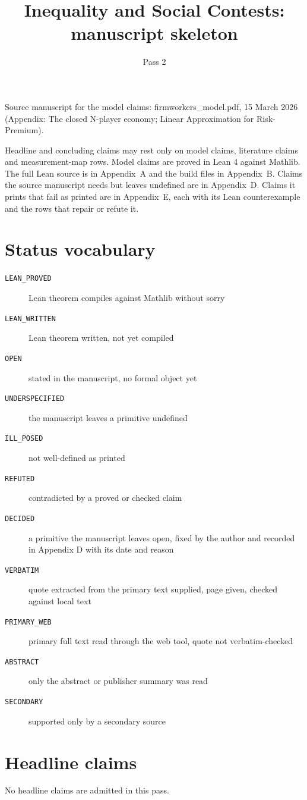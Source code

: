 \documentclass[10pt]{article}
\title{Inequality and Social Contests: manuscript skeleton}
\date{Pass 2}
\begin{document}
\maketitle
Source manuscript for the model claims: firmworkers\_model.pdf, 15 March 2026 (Appendix: The closed N-player economy; Linear Approximation for Risk-Premium).

Headline and concluding claims may rest only on model claims, literature claims and measurement-map rows. Model claims are proved in Lean 4 against Mathlib. The full Lean source is in Appendix~A and the build files in Appendix~B. Claims the source manuscript needs but leaves undefined are in Appendix~D. Claims it prints that fail as printed are in Appendix~E, each with its Lean counterexample and the rows that repair or refute it.

\section*{Status vocabulary}
\begin{description}
\item[\texttt{LEAN\_PROVED}] Lean theorem compiles against Mathlib without sorry
\item[\texttt{LEAN\_WRITTEN}] Lean theorem written, not yet compiled
\item[\texttt{OPEN}] stated in the manuscript, no formal object yet
\item[\texttt{UNDERSPECIFIED}] the manuscript leaves a primitive undefined
\item[\texttt{ILL\_POSED}] not well-defined as printed
\item[\texttt{REFUTED}] contradicted by a proved or checked claim
\item[\texttt{DECIDED}] a primitive the manuscript leaves open, fixed by the author and recorded in Appendix D with its date and reason
\item[\texttt{VERBATIM}] quote extracted from the primary text supplied, page given, checked against local text
\item[\texttt{PRIMARY\_WEB}] primary full text read through the web tool, quote not verbatim-checked
\item[\texttt{ABSTRACT}] only the abstract or publisher summary was read
\item[\texttt{SECONDARY}] supported only by a secondary source
\end{description}

\section{Headline claims}
No headline claims are admitted in this pass.
\end{document}
